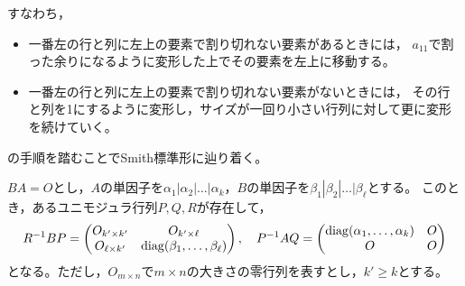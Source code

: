 \documentclass[uplatex]{jsarticle}
\begin{document}
すなわち，
\begin{itemize}
  \item 一番左の行と列に左上の要素で割り切れない要素があるときには，
  $a_{11}$で割った余りになるように変形した上でその要素を左上に移動する。
  \item 一番左の行と列に左上の要素で割り切れない要素がないときには，
  その行と列を1にするように変形し，サイズが一回り小さい行列に対して更に変形を続けていく。
\end{itemize}
の手順を踏むことでSmith標準形に辿り着く。

\begin{hodai}
  \label{hodai:homology3.unimod}
  $BA = O$とし，$A$の単因子を$\alpha_{1} | \alpha_{2} | \dots | \alpha_{k}$，$B$の単因子を$\beta_{1} | \beta_{2} | \dots | \beta_{\ell}$とする。
  このとき，あるユニモジュラ行列$P,Q,R$が存在して，
  \begin{equation}
    R^{-1} B P = \begin{pmatrix}
      O_{k' \times k'} & O_{k' \times \ell} \\ O_{\ell \times k'} & \operatorname{diag} (\beta_{1}, \dots, \beta_{\ell})
    \end{pmatrix}, \quad
    P^{-1} A Q = \begin{pmatrix}
      \operatorname{diag} (\alpha_{1}, \dots, \alpha_{k}) & O \\ O & O
    \end{pmatrix}
  \end{equation}
  となる。ただし，$O_{m \times n}$で$m \times n$の大きさの零行列を表すとし，$k' \ge k$とする。
\end{hodai}
\end{document}
